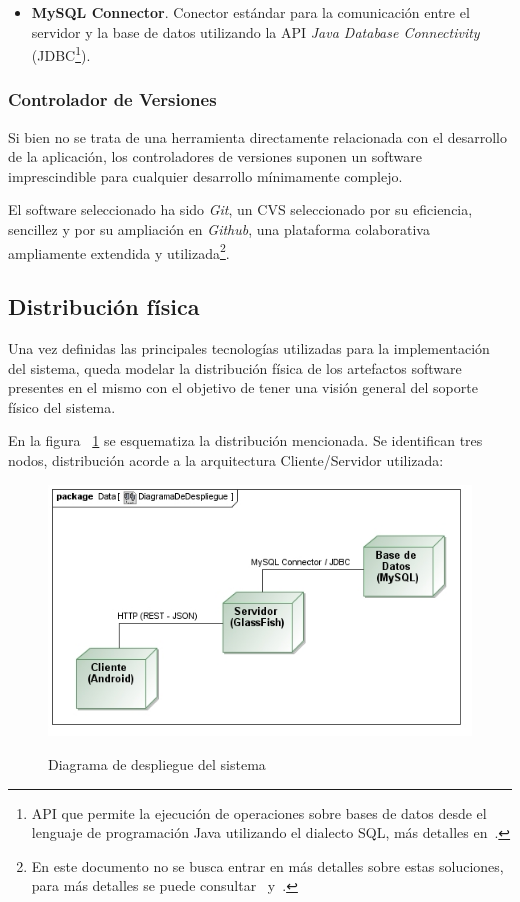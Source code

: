 \begin{itemize}
	\item \textbf{MySQL Connector}. Conector estándar para la comunicación entre el servidor y la base de datos utilizando la API \emph{Java Database Connectivity} (JDBC\footnote{API que permite la ejecución de operaciones sobre bases de datos desde el lenguaje de programación Java utilizando el dialecto SQL, más detalles en~\cite{OraDB}.}).
\end{itemize}

\subsubsection{Controlador de Versiones}

Si bien no se trata de una herramienta directamente relacionada con el desarrollo de la aplicación, los controladores de versiones suponen un software imprescindible para cualquier desarrollo mínimamente complejo.

El software seleccionado ha sido \emph{Git}, un CVS seleccionado por su eficiencia, sencillez y por su ampliación en \emph{Github}, una plataforma colaborativa ampliamente extendida y utilizada\footnote{En este documento no se busca entrar en más detalles sobre estas soluciones, para más detalles se puede consultar~\cite{Git} y~\cite{GitHb}.}.

\subsection{Distribución física}

Una vez definidas las principales tecnologías utilizadas para la implementación del sistema, queda modelar la distribución física de los artefactos software presentes en el mismo con el objetivo de tener una visión general del soporte físico del sistema.

En la figura ~\ref{fig:diagramaDespliegue} se esquematiza la distribución mencionada. Se identifican tres nodos, distribución acorde a la arquitectura Cliente/Servidor utilizada:

\begin{figure} [!htb]
	\centering
	{\includegraphics[width=\linewidth,height=\textheight,keepaspectratio]{Images/Diagramas/09_DiagramaDeDespliegue}}
	\caption{Diagrama de despliegue del sistema}
	\label{fig:diagramaDespliegue}
\end{figure}

